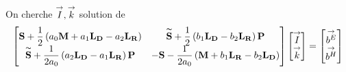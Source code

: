     \begin{prop}
      \label{prop:form_int:ci3}
      On cherche \({\overset{\rightarrow}{I}},{\overset{\rightarrow}{k}}\) solution de
      \begin{equation*}
        \begin{bmatrix}
          \mathbf{S} +  \dfrac{1}{2} \left(a_0 \mathbf{M} + a_1 \mathbf{L_D} - a_2 \mathbf{L_R}\right) & \mathbf{\overset{\thicksim}{S}} + \dfrac{1}{2}\left(b_1 \mathbf{L_D} - b_2 \mathbf{L_R} \right)\mathbf{P} \\
          \mathbf{\overset{\thicksim}{S}} + \dfrac{1}{2a_0}\left( a_2 \mathbf{L_D} - a_1 \mathbf{L_R} \right)\mathbf{P} & -\mathbf{S} - \dfrac{1}{2a_0}\left(\mathbf{M} + b_1 \mathbf{L_R} - b_2 \mathbf{L_D} \right)
        \end{bmatrix}
        \begin{bmatrix}
          {\overset{\rightarrow}{I}}\\
          {\overset{\rightarrow}{k}}
        \end{bmatrix}
        =
        \begin{bmatrix}
          {\overset{\rightarrow}{b^E}}\\
          {\overset{\rightarrow}{b^H}}
        \end{bmatrix}
      \end{equation*}
    \end{prop}
